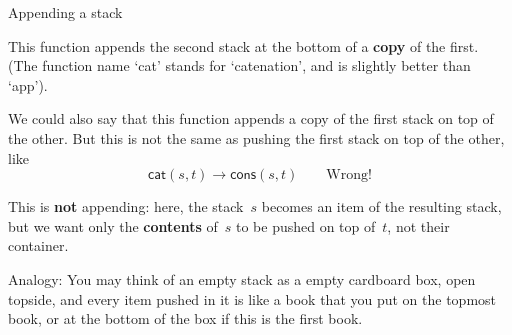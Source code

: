 \documentclass[compress,dvipdfmx]{beamer}
\newcommand\fun[1]{\textsf{#1}}
\begin{document}
%
\begin{frame}{Appending a stack}

  This function appends the second stack at the bottom of a
  \textbf{copy} of the first. (The function name `\fun{cat}' stands
  for `catenation', and is slightly better than `\fun{app}').

  \bigskip

  We could also say that this function appends a copy of the first
  stack on top of the other. But this is not the same as pushing the
  first stack on top of the other, like
  \begin{equation*}
    \fun{cat}(s,t) \rightarrow \fun{cons}(s,t) \qquad
    \text{Wrong!}
  \end{equation*}

  This is \textbf{not} appending: here, the stack~\(s\) becomes an
  item of the resulting stack, but we want only the \textbf{contents}
  of~\(s\) to be pushed on top of~\(t\), not their container.

  \bigskip

  Analogy: You may think of an empty stack as a empty cardboard box,
  open topside, and every item pushed in it is like a book that you
  put on the topmost book, or at the bottom of the box if this is the
  first book.

\end{frame}
\end{document}
